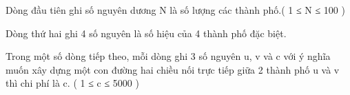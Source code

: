 Dòng đầu tiên ghi số nguyên dương N là số lượng các thành phố.( 1 ≤ N ≤ 100 )  

   Dòng thứ hai ghi 4 số nguyên là số hiệu của 4 thành phố đặc biệt.  

   Trong một số dòng tiếp theo, mỗi dòng ghi 3 số nguyên u, v và c với ý nghĩa muốn xây dựng một con đường hai chiều nối trực tiếp giữa 2 thành phố u và v thì chi phí là c.  ( 1 ≤ c ≤ 5000 )